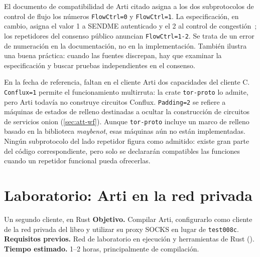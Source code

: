 \begin{attenzione}
El documento de compatibilidad de Arti citado asigna a los dos subprotocolos de control de flujo los números \texttt{FlowCtrl=0} y \texttt{FlowCtrl=1}. La especificación, en cambio, asigna el valor 1 a SENDME autenticado y el 2 al control de congestión~; los repetidores del consenso público anuncian \texttt{FlowCtrl=1-2}. Se trata de un error de numeración en la documentación, no en la implementación. También ilustra una buena práctica: cuando las fuentes discrepan, hay que examinar la especificación y buscar pruebas independientes en el consenso.
\end{attenzione}

En la fecha de referencia, faltan en el cliente Arti dos capacidades del cliente C. \texttt{Conflux=1} permite el funcionamiento multirruta: la crate \texttt{tor-proto} lo admite, pero Arti todavía no construye circuitos Conflux. \texttt{Padding=2} se refiere a máquinas de estados de relleno destinadas a ocultar la construcción de circuitos de servicios onion (\cref{sec:att-wf}). Aunque \texttt{tor-proto} incluye un marco de relleno basado en la biblioteca \emph{maybenot}, esas máquinas aún no están implementadas. Ningún subprotocolo del lado repetidor figura como admitido: existe gran parte del código correspondiente, pero solo se declararán compatibles las funciones cuando un repetidor funcional pueda ofrecerlas.

\section{Laboratorio: Arti en la red privada}\label{sec:lab-arti}

\begin{laboratorio}[20]{Un segundo cliente, en Rust}
\textbf{Objetivo.} Compilar Arti, configurarlo como cliente de la red privada del libro y utilizar su proxy SOCKS en lugar de \texttt{test008c}.\\
\textbf{Requisitos previos.} Red de laboratorio en ejecución y herramientas de Rust ().\\
\textbf{Tiempo estimado.} 1--2 horas, principalmente de compilación.
\end{laboratorio}

